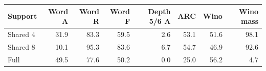 \begin{tabular}{lrrrrrrr}
\toprule
Support & Word A & Word R & Word F & Depth 5/6 A & ARC & Wino & Wino mass \\
\midrule
Shared 4 & 31.9 & 83.3 & 59.5 & 2.6 & 53.1 & 51.6 & 98.1 \\
Shared 8 & 10.1 & 95.3 & 83.6 & 6.7 & 54.7 & 46.9 & 92.6 \\
Full & 49.5 & 77.6 & 50.2 & 0.0 & 25.0 & 56.2 & 4.7 \\
\bottomrule
\end{tabular}

